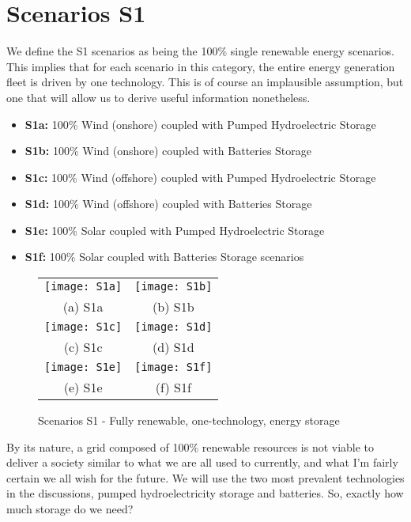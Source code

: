 \section{Scenarios S1}

We define the S1 scenarios as being the 100\% single renewable energy scenarios. This implies that for each scenario in this category, the entire energy generation fleet is driven by one technology. This is of course an implausible assumption, but one that will allow us to derive useful information nonetheless.

\begin{kaobox}[frametitle=S1 scenarios]
\begin{itemize}
	\item \textbf{S1a:} 100\% Wind (onshore) coupled with Pumped Hydroelectric Storage
	\item \textbf{S1b:} 100\% Wind (onshore) coupled with Batteries Storage
	\item \textbf{S1c:} 100\% Wind (offshore) coupled with Pumped Hydroelectric Storage
	\item \textbf{S1d:} 100\% Wind (offshore) coupled with Batteries Storage
	\item \textbf{S1e:} 100\% Solar coupled with Pumped Hydroelectric Storage
	\item \textbf{S1f:} 100\% Solar coupled with Batteries Storage scenarios
\end{itemize}
\end{kaobox}


\begin{figure*}
\begin{tabular}{cc}
  \texttt{[image: S1a]} &   \texttt{[image: S1b]} \\
(a) S1a & (b) S1b \\[6pt]
 \texttt{[image: S1c]} &   \texttt{[image: S1d]} \\
(c) S1c & (d) S1d \\[6pt]
 \texttt{[image: S1e]} &   \texttt{[image: S1f]} \\
(e) S1e & (f) S1f \\[6pt]
\end{tabular}
\caption{Scenarios S1 - Fully renewable, one-technology, energy storage}
\end{figure*}



By its nature, a grid composed of 100\% renewable resources is not viable to deliver a society similar to what we are all used to currently, and what I'm fairly certain we all wish for the future. We will use the two most prevalent technologies in the discussions, pumped hydroelectricity storage and batteries. So, exactly how much storage do we need?

